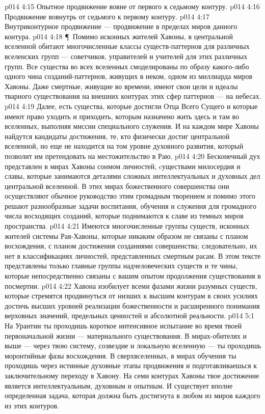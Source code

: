 \vs p014 4:15 \bibnobreakspace Опытное продвижение вовне от первого к седьмому контуру.
\vs p014 4:16 \bibnobreakspace Продвижение вовнутрь от седьмого к первому контуру.
\vs p014 4:17 \bibnobreakspace Внутриконтурное продвижение --- продвижение в пределах миров данного контура.
\vs p014 4:18 \P\ Помимо исконных жителей Хавоны, в центральной вселенной обитают многочисленные классы существ\hyp{}паттернов для различных вселенских групп --- советчиков, управителей и учителей для этих различных групп. Все существа во всех вселенных смоделированы по образу какого\hyp{}либо одного чина созданий\hyp{}паттернов, живущих в неком, одном из миллиарда миров Хавоны. Даже смертные, живущие во времени, имеют свои цели и идеалы тварного существования на внешних контурах этих сфер паттернов --- на небесах.
\vs p014 4:19 Далее, есть существа, которые достигли Отца Всего Сущего и которые имеют право уходить и приходить, которым назначено жить здесь и там во вселенных, выполняя миссии специального служения. И на каждом мире Хавоны найдутся кандидаты достижения, те, кто физически достиг центральной вселенной, но еще не находится на том уровне духовного развития, который позволит им претендовать на местожительство в Раю.
\vs p014 4:20 Бесконечный дух представлен в мирах Хавоны сонмом личностей, cуществами милосердия и славы, которые занимаются деталями сложных интеллектуальных и духовных дел центральной вселенной. В этих мирах божественного совершенства они осуществляют обычное руководство этим громадным творением и помимо этого решают разнообразные задачи воспитания, обучения и служения для громадного числа восходящих созданий, которые поднимаются к славе из темных миров пространства.
\vs p014 4:21 Имеются многочисленные группы существ, исконных жителей системы Рая\hyp{}Хавоны, которые никаким образом не связаны с планом восхождения, с планом достижения созданиями совершенства; следовательно, их нет в классификациях личностей, представленных смертным расам. В этом тексте представлены только главные группы надчеловеческих существ и те чины, которые непосредственно связаны с вашим опытом продолжения существования в посмертии.
\vs p014 4:22 Хавона изобилует всеми фазами жизни разумных существ, которые стремятся продвинуться от низших к высшим контурам в своих усилиях достичь высших уровней реализации божественности и расширенного понимания верховных значений, предельных ценностей и абсолютной реальности.
\vs p014 5:1 На Урантии ты проходишь короткое интенсивное испытание во время твоей первоначальной жизни --- материального существования. В мирах\hyp{}обителях и выше --- через твою систему, созвездие и локальную вселенную --- ты проходишь моронтийные фазы восхождения. В сверхвселенных, в мирах обучения ты проходишь через истинные духовные этапы продвижения и подготавливаешься к заключительному переходу в Хавону. На семи контурах Хавоны твое достижение является интеллектуальным, духовным и опытным. И существует вполне определенная задача, которая должна быть достигнута в любом из миров каждого из этих контуров.
